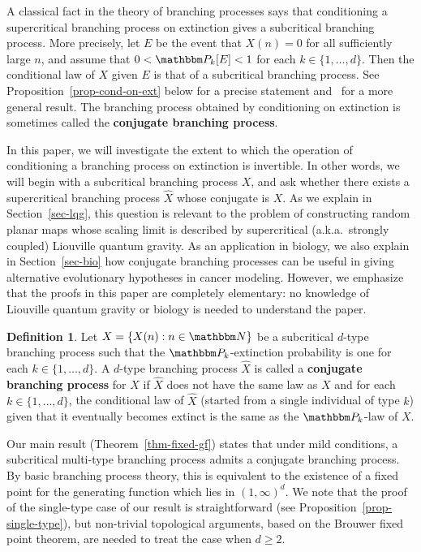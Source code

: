 \documentclass[11pt]{article}
\theoremstyle{plain}
\theoremstyle{definition}
\newtheorem{defn}[thm]{Definition}
\numberwithin{equation}{section}
\newcommand{\BB}{\mathbbm}
\newcommand{\wh}{\widehat}
\begin{document}
A classical fact in the theory of branching processes says that conditioning a supercritical branching process on extinction gives a subcritical branching process. More precisely, let $E$ be the event that $X(n) = 0$ for all sufficiently large $n$, and assume that $0 < \BB P_k[E] < 1$ for each $k\in\{1,\dots,d\}$. Then the conditional law of $X$ given $E$ is that of a subcritical branching process. See Proposition~\ref{prop-cond-on-ext} below for a precise statement and~\cite[Theorem 1]{jl-cond-on-ext} for a more general result. The branching process obtained by conditioning on extinction is sometimes called the \textbf{conjugate branching process}.

 
In this paper, we will investigate the extent to which the operation of conditioning a branching process on extinction is invertible. In other words, we will begin with a subcritical branching process $X$, and ask whether there exists a supercritical branching process $\wh X$ whose conjugate is $X$. As we explain in Section~\ref{sec-lqg}, this question is relevant to the problem of constructing random planar maps whose scaling limit is described by supercritical (a.k.a.\ strongly coupled) Liouville quantum gravity. As an application in biology, we also explain in Section~\ref{sec-bio} how conjugate branching processes can be useful in giving alternative evolutionary hypotheses in cancer modeling. However, we emphasize that the proofs in this paper are completely elementary: no knowledge of Liouville quantum gravity or biology is needed to understand the paper. 
 
\begin{defn} \label{def-conjugate}
Let $X = \{X(n) : n\in\BB N\}$ be a subcritical $d$-type branching process such that the $\BB P_k$-extinction probability is one for each $k\in \{1,\dots,d\}$. 
A $d$-type branching process $\wh X$ is called a \textbf{conjugate branching process} for $X$ if $\wh X$ does not have the same law as $X$ and for each $k\in \{1,\dots,d\}$, the conditional law of $\wh X$ (started from a single individual of type $k$) given that it eventually becomes extinct is the same as the $\BB P_k$-law of $X$. 
\end{defn}
Our main result (Theorem~\ref{thm-fixed-gf}) states that under mild conditions, a subcritical multi-type branching process admits a conjugate branching process. By basic branching process theory, this is equivalent to the existence of a fixed point for the generating function which lies in $(1,\infty)^d$. We note that the proof of the single-type case of our result is straightforward (see Proposition~\ref{prop-single-type}), but non-trivial topological arguments, based on the Brouwer fixed point theorem, are needed to treat the case when $d\geq 2$. 
 
\end{document}
